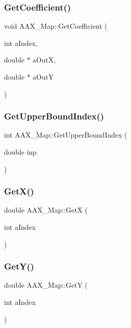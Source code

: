 \subsubsection{\texorpdfstring{GetCoefficient()}{GetCoefficient()}}
{\footnotesize\ttfamily void A\+A\+X\+\_\+\+Map\+::\+Get\+Coefficient (\begin{DoxyParamCaption}\item[{int}]{a\+Index,  }\item[{double $\ast$}]{a\+OutX,  }\item[{double $\ast$}]{a\+OutY }\end{DoxyParamCaption})}

\mbox{\label{a01981_a20957b576d8a3a8b04596adf7c24ff07}} 
\subsubsection{\texorpdfstring{GetUpperBoundIndex()}{GetUpperBoundIndex()}}
{\footnotesize\ttfamily int A\+A\+X\+\_\+\+Map\+::\+Get\+Upper\+Bound\+Index (\begin{DoxyParamCaption}\item[{double}]{inp }\end{DoxyParamCaption})}

\mbox{\label{a01981_a5448134aa48e106699d799d7cac3794d}} 
\subsubsection{\texorpdfstring{GetX()}{GetX()}}
{\footnotesize\ttfamily double A\+A\+X\+\_\+\+Map\+::\+GetX (\begin{DoxyParamCaption}\item[{int}]{a\+Index }\end{DoxyParamCaption})\hspace{0.3cm}{\ttfamily [inline]}}

\mbox{\label{a01981_a095b47a4216633fe5167e3d661f80371}} 
\subsubsection{\texorpdfstring{GetY()}{GetY()}}
{\footnotesize\ttfamily double A\+A\+X\+\_\+\+Map\+::\+GetY (\begin{DoxyParamCaption}\item[{int}]{a\+Index }\end{DoxyParamCaption})\hspace{0.3cm}{\ttfamily [inline]}}

